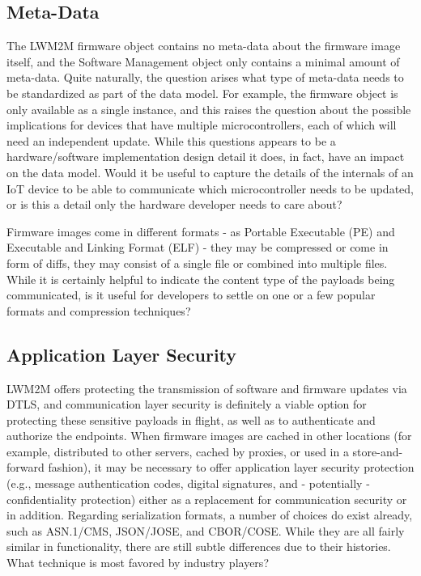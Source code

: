 \documentclass[peerreview, a4paper, 7pt]{IEEEtran}
\begin{document}
\subsection{Meta-Data}

The LWM2M firmware object contains no meta-data about the firmware image itself, and the Software Management object only contains a minimal amount of meta-data. Quite naturally, the question arises what type of meta-data needs to be standardized as part of the data model. For example, the firmware object is only available as a single instance, and this raises the question about the possible implications for devices that have multiple microcontrollers, each of which will need an independent update. While this questions appears to be a hardware/software implementation design detail it does, in fact, have an impact on the data model. Would it be useful to capture the details of the internals of an IoT device to be able to communicate which microcontroller needs to be updated, or is this a detail only the hardware developer needs to care about? 

Firmware images come in different formats - as Portable Executable (PE) and Executable and Linking Format (ELF) - they may be compressed or come in form of diffs, they may consist of a single file or combined into multiple files. While it is certainly helpful to indicate the content type of the payloads being communicated, is it useful for developers to settle on one or a few popular formats and compression techniques?

\subsection{Application Layer Security}

LWM2M offers protecting the transmission of software and firmware updates via DTLS, and communication layer security is definitely a viable option for protecting these sensitive payloads in flight, as well as to authenticate and authorize the endpoints. When firmware images are cached in other locations (for example, distributed to other servers, cached by proxies, or used in a store-and-forward fashion), it may be necessary to offer application layer security protection (e.g., message authentication codes, digital signatures, and - potentially - confidentiality protection) either as a replacement for communication security or in addition. Regarding serialization formats, a number of choices do exist already, such as ASN.1/CMS, JSON/JOSE, and CBOR/COSE. While they are all fairly similar in functionality, there are still subtle differences due to their histories. What technique is most favored by industry players? 
\end{document}
